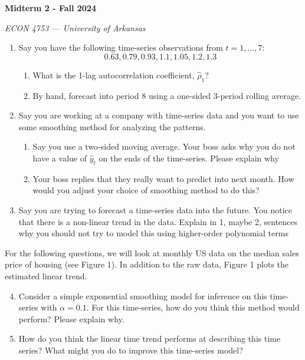 \documentclass[12pt]{article}
\begin{document}
\begin{center}
  {\Huge\bf Midterm 2 - Fall 2024}
  
  \smallskip
  {\large\it  ECON 4753 — University of Arkansas}
\end{center}

\vspace{5mm}
\begin{enumerate}
  \item Say you have the following time-series observations from $t = 1, \dots, 7$:
  \vspace*{-\bigskipamount}
  $$
    0.63, 0.79, 0.93, 1.1, 1.05, 1.2, 1.3
  $$

  \begin{enumerate}
    \item What is the 1-lag autocorrelation coefficient, $\hat{\rho}_1$?
      
    \item By hand, forecast into period $8$ using a one-sided 3-period rolling average.
  \end{enumerate}
  
  \item Say you are working at a company with time-series data and you want to use some smoothing method for analyzing the patterns. 
  \begin{enumerate}
    \item Say you use a two-sided moving average. Your boss asks why you do not have a value of $\hat{y}_t$ on the ends of the time-series. Please explain why
    
    \item Your boss replies that they really want to predict into next month. How would you adjust your choice of smoothing method to do this?
  \end{enumerate}

  \item Say you are trying to forecast a time-series data into the future. You notice that there is a non-linear trend in the data. Explain in 1, maybe 2, sentences why you should not try to model this using higher-order polynomial terms
\end{enumerate}

\bigskip\bigskip
\noindent For the following questions, we will look at monthly US data on the median sales price of housing (see Figure 1). In addition to the raw data, Figure 1 plots the estimated linear trend.

\begin{enumerate}
  \setcounter{enumi}{3}
  \item Consider a simple exponential smoothing model for inference on this time-series with $\alpha = 0.1$. For this time-series, how do you think this method would perform? Please explain why.
  
  \item How do you think the linear time trend performs at describing this time series? What might you do to improve this time-series model?
\end{enumerate}
\end{document}
